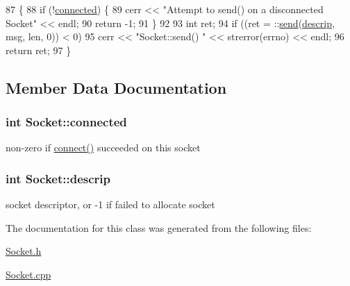 \begin{DoxyCode}
87                                          \{
88   \textcolor{keywordflow}{if} (!\hyperlink{classSocket_af04394b9f1235562146aaa9291df70f8}{connected}) \{
89     cerr << \textcolor{stringliteral}{"Attempt to send() on a disconnected Socket"} << endl;
90     \textcolor{keywordflow}{return} -1;
91   \}
92 
93   \textcolor{keywordtype}{int} ret;
94   \textcolor{keywordflow}{if} ((ret = ::\hyperlink{classSocket_aca3e5b9c5459a50bd8fb03d29ef9e48e}{send}(\hyperlink{classSocket_a457f5e3f2429eb859f9e80f064073874}{descrip}, msg, len, 0)) < 0) 
95     cerr << \textcolor{stringliteral}{"Socket::send() "} << strerror(errno) << endl;
96   \textcolor{keywordflow}{return} ret;
97 \}
\end{DoxyCode}


\subsection{Member Data Documentation}
\hypertarget{classSocket_af04394b9f1235562146aaa9291df70f8}{}
\subsubsection[{connected}]{\setlength{\rightskip}{0pt plus 5cm}int Socket\+::connected\hspace{0.3cm}{\ttfamily [protected]}}\label{classSocket_af04394b9f1235562146aaa9291df70f8}
non-\/zero if \hyperlink{classSocket_abc97e53080c01a06cc8f5efea7c6cdf0}{connect()} succeeded on this socket \hypertarget{classSocket_a457f5e3f2429eb859f9e80f064073874}{}
\subsubsection[{descrip}]{\setlength{\rightskip}{0pt plus 5cm}int Socket\+::descrip\hspace{0.3cm}{\ttfamily [protected]}}\label{classSocket_a457f5e3f2429eb859f9e80f064073874}
socket descriptor, or -\/1 if failed to allocate socket 

The documentation for this class was generated from the following files\+:\begin{DoxyCompactItemize}
\item 
\hyperlink{Socket_8h}{Socket.\+h}\item 
\hyperlink{Socket_8cpp}{Socket.\+cpp}\end{DoxyCompactItemize}
